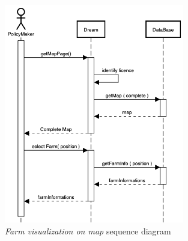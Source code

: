 \begin{enumerate}
    \begin{figure}[H]
        \begin{center}
        \includegraphics[width=0.7\textwidth]{sequence/searchOnMap.png}
        \caption{\emph{Farm visualization on map} sequence diagram}
        \label{fig:sequence12}
        \end{center}
    \end{figure}


\end{enumerate}
